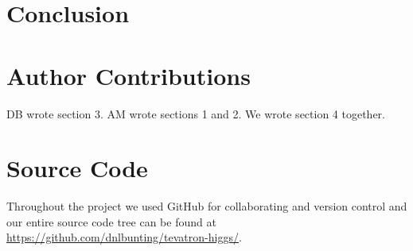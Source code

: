 \documentclass{article}
\begin{document}
\section{Conclusion} %
\label{sec:conclusion}


\section*{Author Contributions} %
\label{sec:author_contributions}
DB wrote section 3.
AM wrote sections 1 and 2.
We wrote section 4 together.

\section*{Source Code} %
\label{sec:source_code}

Throughout the project we used GitHub for collaborating and version control and our entire source code tree can be found at \url{https://github.com/dnlbunting/tevatron-higgs/}.



 
\end{document}
